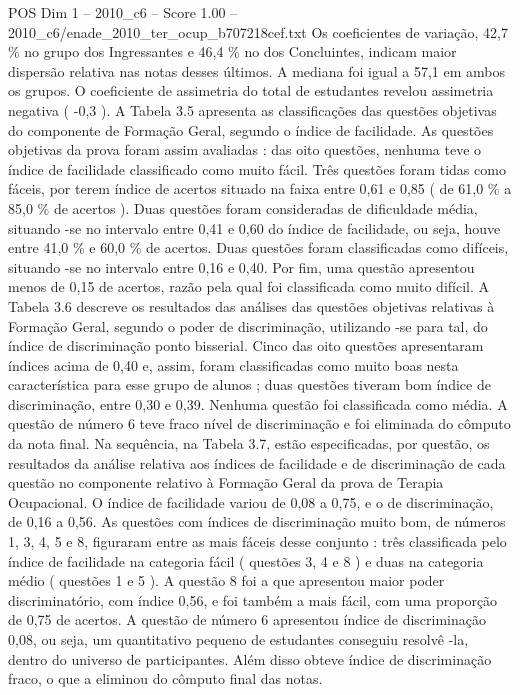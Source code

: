 \begin{textsample}{POS Dim 1 – 2010\_c6 – Score 1.00 – 2010\_c6/enade\_2010\_ter\_ocup\_b707218cef.txt}
Os coeficientes de variação, 42,7 \% no grupo dos Ingressantes e 46,4 \% no dos Concluintes, indicam maior dispersão relativa nas notas desses últimos.
A mediana foi igual a 57,1 em ambos os grupos.
O coeficiente de assimetria do total de estudantes revelou assimetria negativa ( -0,3 ).
A Tabela 3.5 apresenta as classificações das questões objetivas do componente de Formação Geral, segundo o índice de facilidade.
As questões objetivas da prova foram assim avaliadas : das oito questões, nenhuma teve o índice de facilidade classificado como muito fácil.
Três questões foram tidas como fáceis, por terem índice de acertos situado na faixa entre 0,61 e 0,85 ( de 61,0 \% a 85,0 \% de acertos ).
Duas questões foram consideradas de dificuldade média, situando -se no intervalo entre 0,41 e 0,60 do índice de facilidade, ou seja, houve entre 41,0 \% e 60,0 \% de acertos.
Duas questões foram classificadas como difíceis, situando -se no intervalo entre 0,16 e 0,40.
Por fim, uma questão apresentou menos de 0,15 de acertos, razão pela qual foi classificada como muito difícil.
A Tabela 3.6 descreve os resultados das análises das questões objetivas relativas à Formação Geral, segundo o poder de discriminação, utilizando -se para tal, do índice de discriminação ponto bisserial.
Cinco das oito questões apresentaram índices acima de 0,40 e, assim, foram classificadas como muito boas nesta característica para esse grupo de alunos ; duas questões tiveram bom índice de discriminação, entre 0,30 e 0,39.
Nenhuma questão foi classificada como média.
A questão de número 6 teve fraco nível de discriminação e foi eliminada do cômputo da nota final.
Na sequência, na Tabela 3.7, estão especificadas, por questão, os resultados da análise relativa aos índices de facilidade e de discriminação de cada questão no componente relativo à Formação Geral da prova de Terapia Ocupacional.
O índice de facilidade variou de 0,08 a 0,75, e o de discriminação, de 0,16 a 0,56.
As questões com índices de discriminação muito bom, de números 1, 3, 4, 5 e 8, figuraram entre as mais fáceis desse conjunto : três classificada pelo índice de facilidade na categoria fácil ( questões 3, 4 e 8 ) e duas na categoria médio ( questões 1 e 5 ).
A questão 8 foi a que apresentou maior poder discriminatório, com índice 0,56, e foi também a mais fácil, com uma proporção de 0,75 de acertos.
A questão de número 6 apresentou índice de discriminação 0,08, ou seja, um quantitativo pequeno de estudantes conseguiu resolvê -la, dentro do universo de participantes.
Além disso obteve índice de discriminação fraco, o que a eliminou do cômputo final das notas.

\end{textsample}
